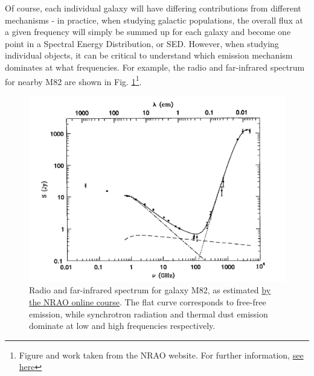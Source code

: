 \pg
Of course, each individual galaxy will have differing contributions from different mechanisms - in practice, when studying galactic populations, the overall flux at a given frequency will simply be summed up for each galaxy and become one point in a Spectral Energy Distribution, or SED. However, when studying individual objects, it can be critical to understand which emission mechanism dominates at what frequencies. %
For example, the radio and far-infrared spectrum for nearby M82 are shown in Fig. \ref{plot.m82.spectrum}\footnote{Figure and work taken from the NRAO website. For further information, \href{https://www.cv.nrao.edu/course/astr534/FreeFreeEmission.html}{see here}}.
\begin{figure}[!h]
\centering
\includegraphics[width=\textwidth]{images/M82Spectrum.png}
\caption{\label{plot.m82.spectrum} Radio and far-infrared spectrum for galaxy M82, as estimated \href{https://www.cv.nrao.edu/course/astr534/FreeFreeEmission.html}{by the NRAO online course}. The flat curve corresponds to free-free emission, while synchrotron radiation and thermal dust emission dominate at low and high frequencies respectively.}
\end{figure}

\pg


